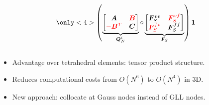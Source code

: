 \documentclass[compress]{beamer}
\theoremstyle{plain}
\newcommand{\LRp}[1]{\left( #1 \right)}
\renewcommand{\note}[1]{\textcolor{red}{{#1}}}
\begin{document}
{\begin{columns}
\begin{column}{.51\textwidth}
\[{}
\only<4>{
\LRp{\underbrace{\begin{bmatrix}
\bm{A} & \note{\bm{B}}\\
\note{-\bm{B}^T} & \bm{C}
\end{bmatrix}}_{\bm{Q}_N^i} \circ
\underbrace{\begin{bmatrix}
\bm{F}^{vv}_S & \note{\bm{F}^{vf}_S}\\
\note{\bm{F}^{fv}_S} & \bm{F}^{ff}_S
\end{bmatrix}}_{\bm{F}_S} } \bm{1}
}
\]
\end{column}
\end{columns}
\vspace{.5em}
\begin{itemize}
\item Advantage over tetrahedral elements: tensor product structure.
\vspace{.5em}
\item Reduces computational costs from $O(N^6)$ to $O(N^4)$ in 3D.
\vspace{.5em}
\item New approach: collocate at Gauss nodes instead of GLL nodes.  
\vspace{.5em}
\end{itemize} 
}
\end{document}
